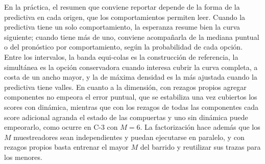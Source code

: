 En la práctica, el resumen que conviene reportar depende de la forma de la predictiva en cada origen, que los comportamientos permiten leer. Cuando la predictiva tiene un solo comportamiento, la esperanza resume bien la curva siguiente; cuando tiene más de uno, conviene acompañarla de la mediana puntual o del pronóstico por comportamiento, según la probabilidad de cada opción. Entre los intervalos, la banda equi-colas es la construcción de referencia, la simultánea es la opción conservadora cuando interesa cubrir la curva completa, a costa de un ancho mayor, y la de máxima densidad es la más ajustada cuando la predictiva tiene valles. En cuanto a la dimensión, con rezagos propios agregar componentes no empeora el error puntual, que se estabiliza una vez cubiertos los scores con dinámica, mientras que con los rezagos de todas las componentes cada score adicional agranda el estado de las compuertas y uno sin dinámica puede empeorarlo, como ocurre en C-3 con $M = 6$. La factorización hace además que los $M$ muestreadores sean independientes y puedan ejecutarse en paralelo, y con rezagos propios basta entrenar el mayor $M$ del barrido y reutilizar sus trazas para los menores.










